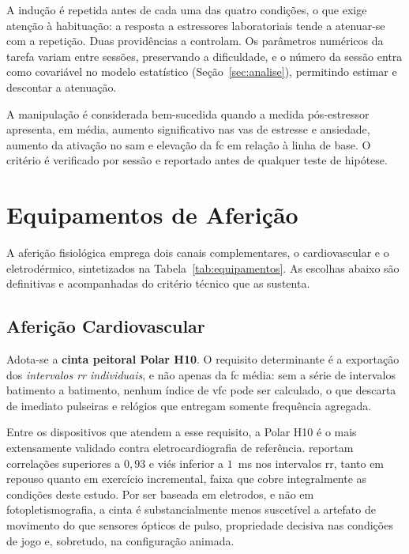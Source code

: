 A indução é repetida antes de cada uma das quatro condições, o que exige atenção à habituação: a resposta a estressores laboratoriais tende a atenuar-se com a repetição. Duas providências a controlam. Os parâmetros numéricos da tarefa variam entre sessões, preservando a dificuldade, e o número da sessão entra como covariável no modelo estatístico (Seção~\ref{sec:analise}), permitindo estimar e descontar a atenuação.

A manipulação é considerada bem-sucedida quando a medida pós-estressor apresenta, em média, aumento significativo nas \gls{vas} de estresse e ansiedade, aumento da ativação no \gls{sam} e elevação da \gls{fc} em relação à linha de base. O critério é verificado por sessão e reportado antes de qualquer teste de hipótese.

\section{Equipamentos de Aferição}\label{sec:equipamentos}

A aferição fisiológica emprega dois canais complementares, o cardiovascular e o eletrodérmico, sintetizados na Tabela~\ref{tab:equipamentos}. As escolhas abaixo são definitivas e acompanhadas do critério técnico que as sustenta.

\subsection{Aferição Cardiovascular}\label{subsec:equip-cardio}

Adota-se a \textbf{cinta peitoral Polar H10}. O requisito determinante é a exportação dos \emph{intervalos \gls{rr} individuais}, e não apenas da \gls{fc} média: sem a série de intervalos batimento a batimento, nenhum índice de \gls{vfc} pode ser calculado, o que descarta de imediato pulseiras e relógios que entregam somente frequência agregada.

Entre os dispositivos que atendem a esse requisito, a Polar H10 é o mais extensamente validado contra eletrocardiografia de referência. \citet{Schaffarczyk2022} reportam correlações superiores a $0{,}93$ e viés inferior a $1$~ms nos intervalos \gls{rr}, tanto em repouso quanto em exercício incremental, faixa que cobre integralmente as condições deste estudo. Por ser baseada em eletrodos, e não em fotopletismografia, a cinta é substancialmente menos suscetível a artefato de movimento do que sensores ópticos de pulso, propriedade decisiva nas condições de jogo e, sobretudo, na configuração animada.

